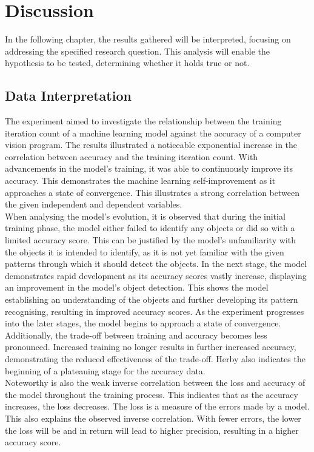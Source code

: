 \section{Discussion}
In the following chapter, the results gathered will be interpreted, focusing on addressing the specified research question. This analysis will enable the hypothesis to be tested, determining whether it holds true or not.

\subsection{Data Interpretation}

The experiment aimed to investigate the relationship between the training iteration count of a machine learning model against the accuracy of a computer vision program. The results illustrated a noticeable exponential increase in the correlation between accuracy and the training iteration count. With advancements in the model's training, it was able to continuously improve its accuracy. This demonstrates the machine learning self-improvement as it approaches a state of convergence. This illustrates a strong correlation between the given independent and dependent variables. \\

When analysing the model's evolution, it is observed that during the initial training phase, the model either failed to identify any objects or did so with a limited accuracy score. This can be justified by the model's unfamiliarity with the objects it is intended to identify, as it is not yet familiar with the given patterns through which it should detect the objects. In the next stage, the model demonstrates rapid development as its accuracy scores vastly increase, displaying an improvement in the model's object detection. This shows the model establishing an understanding of the objects and further developing its pattern recognising, resulting in improved accuracy scores. As the experiment progresses into the later stages, the model begins to approach a state of convergence. Additionally, the trade-off between training and accuracy becomes less pronounced. Increased training no longer results in further increased accuracy, demonstrating the reduced effectiveness of the trade-off. Herby also indicates the beginning of a plateauing stage for the accuracy data.  \\ 

Noteworthy is also the weak inverse correlation between the loss and accuracy of the model throughout the training process. This indicates that as the accuracy increases, the loss decreases. The loss is a measure of the errors made by a model. This also explains the observed inverse correlation. With fewer errors, the lower the loss will be and in return will lead to higher precision, resulting in a higher accuracy score. \\



